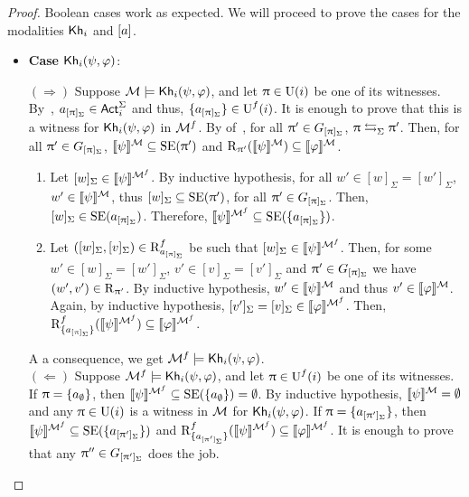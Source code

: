 \begin{proof}
Boolean cases work as expected. We will proceed to prove the cases for the modalities ${\sf Kh}_i$ and $[a]$.

\begin{itemize}
\item \textbf{Case ${\sf Kh}_i(\psi,\varphi)$}:

$(\Rightarrow)$ Suppose $\mathcal{M} \models {\sf Kh}_i(\psi,\varphi)$, and let $\uppi \in \operatorname{U}(i)$ be one of its witnesses.
By~, $a_{[\uppi]_\Sigma} \in {\rm \sf Act}^\Sigma_i$ and thus, $\{ a_{[\uppi]_\Sigma} \} \in \operatorname{U}^f(i)$. It is enough to prove that this is a witness for $ {\sf Kh}_i(\psi,\varphi)$ in $\mathcal{M}^f$. 
By  of~, for all $\uppi' \in G_{[\uppi]_\Sigma}$, $\uppi \mathrel{\leftrightarrows}_\Sigma \uppi'$.
Then, for all $\uppi' \in G_{[\uppi]_\Sigma}$, $\llbracket \psi \rrbracket^{\mathcal{M}} \subseteq \operatorname{SE}(\uppi')$ and $\operatorname{R}_{\uppi'}(\llbracket \psi \rrbracket^{\mathcal{M}}) \subseteq \llbracket \varphi \rrbracket^{\mathcal{M}}$.
    \begin{enumerate}
        \item Let $[w]_\Sigma \in \llbracket \psi \rrbracket^{\mathcal{M}^f}$. By inductive hypothesis, for all $w' \in [w]_\Sigma = [w']_\Sigma$, $w' \in \llbracket \psi \rrbracket^{\mathcal{M}}$,  thus $[w]_\Sigma \subseteq \operatorname{SE}(\uppi')$, for all $\uppi' \in G_{[\uppi]_\Sigma}$.
        Then, $[w]_\Sigma \in \operatorname{SE}(a_{[\uppi]_\Sigma})$. Therefore, $\llbracket \psi \rrbracket^{\mathcal{M}^f} \subseteq \operatorname{SE}(\{ a_{[\uppi]_\Sigma} \})$.

        \item Let $([w]_\Sigma,[v]_\Sigma) \in \operatorname{R}^f_{a_{[\uppi]_\Sigma}}$ be such that $[w]_\Sigma \in \llbracket \psi \rrbracket^{\mathcal{M}^f}$.
        Then, for some $w' \in [w]_\Sigma = [w']_\Sigma$, $v' \in [v]_\Sigma = [v']_\Sigma$ and $\uppi' \in G_{[\uppi]_\Sigma}$ we have $(w',v') \in \operatorname{R}_{\uppi'}$.
        By inductive hypothesis, $w' \in \llbracket \psi \rrbracket^{\mathcal{M}}$ and thus $v' \in \llbracket \varphi \rrbracket^{\mathcal{M}}$.
        Again, by inductive hypothesis, $[v']_\Sigma = [v]_\Sigma \in \llbracket \varphi \rrbracket^{\mathcal{M}^f}$.
        Then, $\operatorname{R}^f_{\{ a_{[\uppi]_\Sigma} \}}(\llbracket \psi \rrbracket^{\mathcal{M}^f}) \subseteq \llbracket \varphi \rrbracket^{\mathcal{M}^f}$.
    \end{enumerate}

A a consequence, we get $\mathcal{M}^f \models {\sf Kh}_i(\psi,\varphi)$. \\

$(\Leftarrow)$ Suppose $\mathcal{M}^f \models {\sf Kh}_i(\psi,\varphi)$, and let $\uppi \in \operatorname{U}^f(i)$ be one of its witnesses. 
If $\uppi = \{ a_\emptyset \}$, then $\llbracket \psi \rrbracket^{\mathcal{M}^f} \subseteq \operatorname{SE}(\{ a_\emptyset \}) = \emptyset$.
By inductive hypothesis, $\llbracket \psi \rrbracket^{\mathcal{M}} = \emptyset$ and any $\uppi \in \operatorname{U}(i)$ is a witness in $\mathcal{M}$ for ${\sf Kh}_i(\psi,\varphi)$. 
If $\uppi = \{ a_{[\uppi']_{\Sigma}} \}$, then $\llbracket \psi \rrbracket^{\mathcal{M}^f} \subseteq \operatorname{SE}(\{ a_{[\uppi']_\Sigma} \})$ and $\operatorname{R}^f_{\{ a_{[\uppi']_\Sigma} \}}(\llbracket \psi \rrbracket^{\mathcal{M}^f}) \subseteq \llbracket \varphi \rrbracket^{\mathcal{M}^f}$.
It is enough to prove that any $\uppi'' \in G_{[\uppi']_\Sigma}$ does the job.


\end{itemize}
\end{proof}
